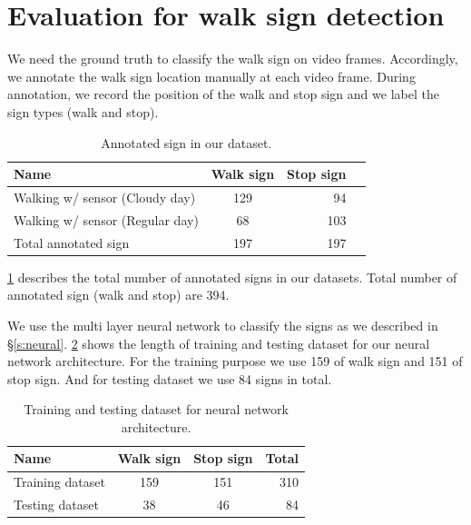 \section{Evaluation for walk sign detection}
We need the ground truth to classify the walk sign on video frames.
Accordingly, we annotate the walk sign location manually at each video frame.
During annotation, we record the position of the walk and stop sign and we label the sign types (walk and stop). 

\begin{table}[ht!]
  \centering
  \caption{Annotated sign in our dataset.}
  \label{t:walk_sign_ann}
  \begin{tabular}{  l  c  r r }
    \rowcolor{gray!50}
    Name & Walk sign  & Stop sign \\
    \hline
    Walking w/ sensor (Cloudy day) & 129 & 94 \\ %
    Walking w/ sensor (Regular day) & 68 & 103  \\%
    Total annotated sign & 197 & 197 \\
    \hline
  \end{tabular}
\end{table}

\ref{t:walk_sign_ann} describes the total number of annotated signs in our datasets.
Total number of annotated sign (walk and stop) are 394.

We use the multi layer neural network to classify the signs as we described in \S\ref{s:neural}.
\ref{t:training_neural} shows the length of training and testing dataset for our neural network architecture.
For the training purpose we use 159 of walk sign and 151 of stop sign.
And for testing dataset we use 84 signs in total.

\begin{table}[ht!]
  \centering
  \caption{Training and testing dataset for neural network architecture.}
  \label{t:training_neural}
  \begin{tabular}{  l  c  c  r}
    \rowcolor{gray!50}
    Name & Walk sign & Stop sign & Total \\
    \hline
    Training dataset & 159 & 151 & 310\\ %
    Testing dataset & 38 & 46 & 84 \\%
   
    \hline
  \end{tabular}
\end{table}

